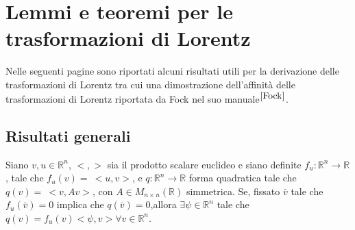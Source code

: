 \chapter{Lemmi e teoremi per le trasformazioni di Lorentz}
\label{chap:LinearitàLorentz}
 Nelle seguenti pagine sono riportati alcuni risultati utili per la derivazione delle trasformazioni di Lorentz tra cui una dimostrazione dell'affinità delle trasformazioni di Lorentz riportata da Fock nel suo manuale$^{\cite{Fock}}$.\\

\section{Risultati generali}

\begin{lemma}
    Siano $v,u\in \mathbb{R}^n$, $<,>$ sia il prodotto scalare euclideo e siano definite $f_u: \mathbb{R}^n\rightarrow\mathbb{R}$, tale che $f_u(v)=\ <u,v>$, e $q:\mathbb{R}^n\rightarrow\mathbb{R}$ forma quadratica tale che $q(v)=\ <v,Av>$, con $A\in M_{n\times n}(\mathbb{R})$ simmetrica. Se, fissato $\bar{v}$ tale che $f_u(\bar{v})=0$ implica che $q(\bar{v})=0$,allora $\exists \psi\in \mathbb{R}^n$ tale che $q(v)=f_u(v)<\psi,v> \forall v\in \mathbb{R}^n$.
    \label{lemm:A1}
\end{lemma}
